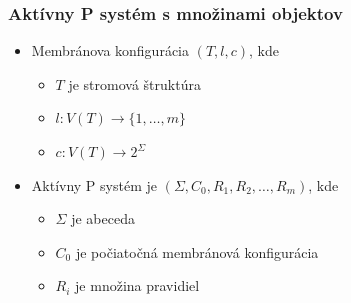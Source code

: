 
\begin{frame}[t]\frametitle{Aktívny P systém s množinami objektov}
  \begin{itemize}
    \item Membránova konfigurácia $(T, l, c)$, kde
    \begin{itemize}
      \item $T$ je stromová štruktúra
      \item $l: V(T) \rightarrow \{1, \ldots, m\}$
      \item $c: V(T) \rightarrow 2^\Sigma$
     \end{itemize}
     \item Aktívny P systém je $(\Sigma, C_0, R_1, R_2, \dots, R_m)$, kde
     \begin{itemize}
       \item $\Sigma$ je abeceda
       \item $C_0$ je počiatočná membránová konfigurácia
       \item $R_i$ je množina pravidiel
     \end{itemize}
  \end{itemize}
\end{frame}



